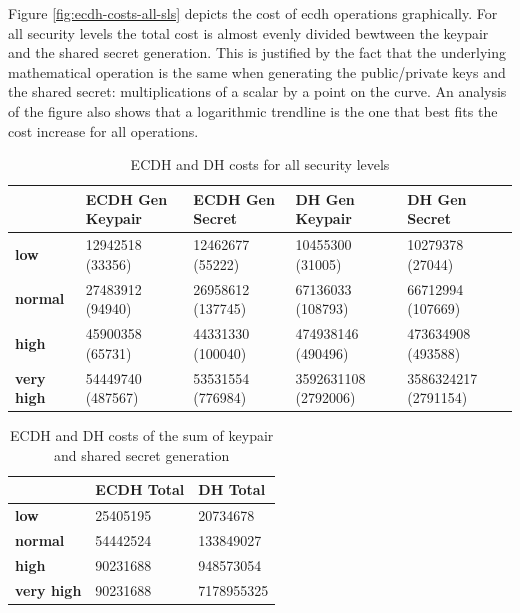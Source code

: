 \documentclass{llncs}
\begin{document}
Figure \ref{fig:ecdh-costs-all-sls} depicts the cost of \gls{ecdh} operations graphically. For all security levels the total cost is almost
evenly divided bewtween the keypair and the shared secret generation. This is justified by the fact that the underlying mathematical operation is
the same when generating the public/private keys and the shared secret: multiplications of a scalar by a point on the curve. An analysis of the figure
also shows that a logarithmic trendline is the one that best fits the cost increase for all operations.

\begin{table}[]
\begin{tabular}{|l|l|l|l|l|}
\hline
                   & \textbf{ECDH Gen Keypair} & \textbf{ECDH Gen Secret} & \textbf{DH Gen Keypair} & \textbf{DH Gen Secret} \\ \hline
\textbf{low}       & 12942518 (33356)          & 12462677 (55222)         & 10455300 (31005)        & 10279378 (27044)       \\ \hline
\textbf{normal}    & 27483912 (94940)          & 26958612 (137745)        & 67136033 (108793)       & 66712994 (107669)      \\ \hline
\textbf{high}      & 45900358 (65731)          & 44331330 (100040)        & 474938146 (490496)      & 473634908 (493588)     \\ \hline
\textbf{very high} & 54449740 (487567)         & 53531554 (776984)        & 3592631108 (2792006)    & 3586324217 (2791154)   \\ \hline
\end{tabular}
\centering \caption{\label{table:ecdh-dh-costs-all-sls} ECDH and DH costs for all security levels}
\end{table}

\begin{table}[]
\begin{tabular}{|l|l|l|}
\hline
                   & \textbf{ECDH Total} & \textbf{DH Total} \\ \hline
\textbf{low}       & 25405195            & 20734678          \\ \hline
\textbf{normal}    & 54442524            & 133849027         \\ \hline
\textbf{high}      & 90231688            & 948573054         \\ \hline
\textbf{very high} & 90231688            & 7178955325        \\ \hline
\end{tabular}
\centering \caption{\label{table:ecdh-dh-costs-total-all-sls} ECDH and DH costs of the sum of keypair and shared secret generation}
\end{table}
\end{document}
